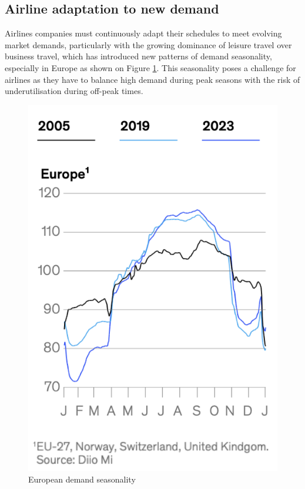 \subsection{Airline adaptation to new demand} %
\label{sub:Airline adaptation to new demand}


Airlines companies must continuously adapt their schedules to meet evolving market demands, particularly with the growing dominance of leisure travel over business travel, which has introduced new patterns of demand seasonality, especially in Europe as shown on Figure \ref{fig:European_demand_seasonality}. This seasonality poses a challenge for airlines as they have to balance high demand during peak seasons with the risk of underutilisation during off-peak times.

\begin{figure}[!ht]
    \centering
    \includegraphics[width=.3\textwidth]{Figures/European Demand.png}
    \caption{European demand seasonality \cite{flight_seasonnality_challenges}}
    \label{fig:European_demand_seasonality}
\end{figure}



